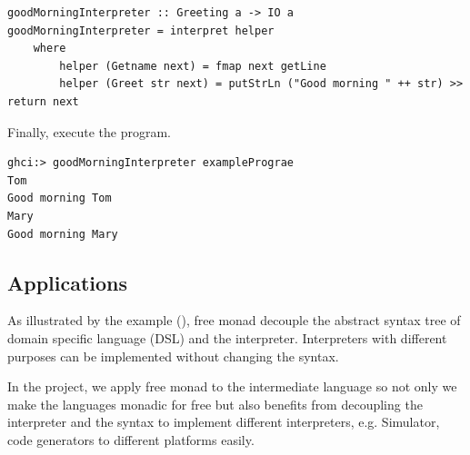 \begin{verbatim}
goodMorningInterpreter :: Greeting a -> IO a
goodMorningInterpreter = interpret helper
    where
        helper (Getname next) = fmap next getLine
        helper (Greet str next) = putStrLn ("Good morning " ++ str) >> return next  
\end{verbatim} 
Finally, execute the program.
\begin{verbatim}
ghci:> goodMorningInterpreter examplePrograe
Tom
Good morning Tom
Mary
Good morning Mary
\end{verbatim}

\subsection{Applications} \label{b:fm:a}
As illustrated by the example (), free monad decouple the abstract syntax tree of domain specific language (DSL) and the interpreter. Interpreters with different purposes can be implemented without changing the syntax.

In the project, we apply free monad to the intermediate language so not only we make the languages monadic for free but also benefits from decoupling the interpreter and the syntax to implement different interpreters, e.g. Simulator, code generators to different platforms easily.